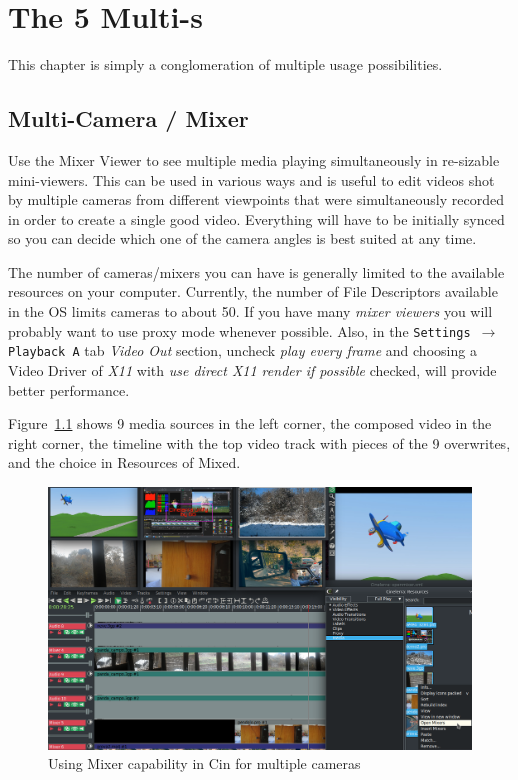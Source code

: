 \chapter{The 5 Multi-s}%
\label{cha:multi_5}

This chapter is simply a conglomeration of multiple usage possibilities.

\section{Multi-Camera / Mixer}%
\label{sec:multicamera_mixer}

Use the Mixer Viewer to see multiple media playing simultaneously in re-sizable mini-viewers.  This can be used in various ways and is useful to edit videos shot by multiple cameras from different viewpoints that were simultaneously recorded in order to create a single good video.  Everything will have to be initially synced so you can decide which one of the camera angles is best suited at any time. 

The number of cameras/mixers you can have is generally limited to the available resources on your computer.  Currently, the number of File Descriptors available in the OS limits cameras to about 50.  If you have many \textit{mixer viewers} you will probably want to use proxy mode whenever possible.  Also, in the \texttt{Settings $\rightarrow$ Playback A} tab \textit{Video Out} section, uncheck \textit{play every frame} and choosing a Video Driver of \textit{X11} with \textit{use direct X11 render if possible} checked, will provide better performance.

Figure~\ref{fig:multicam01} shows 9 media sources in the left corner, the composed video in the right corner, the timeline with the top video track with pieces of the 9 overwrites, and the choice in Resources of Mixed.

\begin{figure}[htpb]
    \centering
    \includegraphics[width=1.0\linewidth]{images/multicam01.png}
    \caption{Using Mixer capability in Cin for multiple cameras}
    \label{fig:multicam01}
\end{figure}

